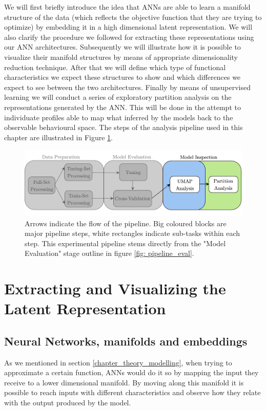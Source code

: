 We will first briefly introduce the idea that ANNs are able to learn a manifold structure of the data (which reflects the objective function that they are trying to optimize) by embedding it in a high dimensional latent representation. We will also clarify the procedure we followed for extracting these representations using our ANN architectures. Subsequently we will illustrate how it is possible to visualize their manifold structures by means of appropriate dimensionality reduction technique.  After that we will define which type of functional characteristics we expect these structures to show  and which differences we expect to see between the two architectures. Finally by means of unsupervised learning we will conduct a series of exploratory partition analysis on the representations generated by the ANN. This will be done in the attempt to individuate profiles able to map what inferred by the models back to the observable behavioural space. The steps of the analysis pipeline used in this chapter are illustrated in Figure \ref{fig: pipeline_inspect}.
\begin{figure}[!htb]
  \centering
  \includegraphics[width=\textwidth]{images/chapter_4/pipeline_inspect.png}
    \caption[\textbf{Representation analysis experimental pipeline}]{Arrows indicate the flow of the pipeline. Big coloured blocks are major pipeline steps, white rectangles indicate sub-tasks within each step. This experimental pipeline stems directly from the "Model Evaluation" stage outline in figure \ref{fig: pipeline_eval}.}
    \label{fig: pipeline_inspect}
\end{figure}

\section{Extracting and Visualizing the Latent Representation}
\label{extract_visulize}

\subsection{Neural Networks, manifolds and embeddings}
\label{manifold_learning_embed}
As we mentioned in section \ref{chapter_theory_modelling}, when trying to approximate a certain function, ANNs would do it so by mapping the input they receive to a lower dimensional manifold. By moving along this manifold it is possible to reach inputs with different characteristics and observe how they relate with the output produced by the model.

